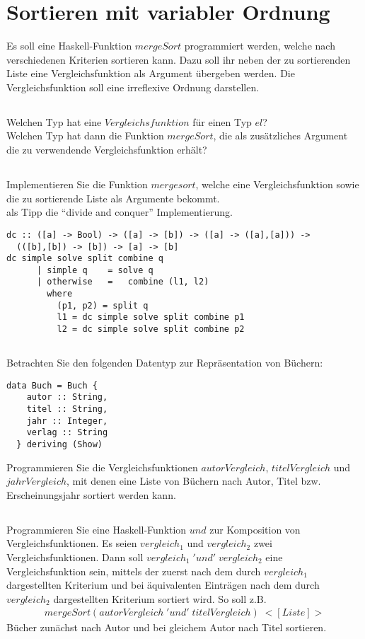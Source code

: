 \documentclass{article}
\begin{document}
\section{Sortieren mit variabler Ordnung}
Es soll eine Haskell-Funktion $mergeSort$ programmiert werden, welche nach verschiedenen
Kriterien sortieren kann. Dazu soll ihr neben der zu sortierenden Liste eine
Vergleichsfunktion als Argument übergeben werden. Die Vergleichsfunktion soll eine
irreflexive Ordnung darstellen.
\subsection{}
Welchen Typ hat eine $Vergleichsfunktion$ für einen Typ $el$?\\
Welchen Typ hat dann die Funktion $mergeSort$, die als zusätzliches Argument die
zu verwendende Vergleichsfunktion erhält?
\subsection{}
Implementieren Sie die Funktion $mergesort$, welche eine Vergleichsfunktion sowie die zu sortierende Liste als Argumente bekommt.\\
als Tipp die "`divide and conquer"' Implementierung.
\begin{lstlisting}
dc :: ([a] -> Bool) -> ([a] -> [b]) -> ([a] -> ([a],[a])) -> 
  (([b],[b]) -> [b]) -> [a] -> [b]
dc simple solve split combine q 
      | simple q 	= solve q
      | otherwise 	= 	combine (l1, l2)
        where 
          (p1, p2) = split q
          l1 = dc simple solve split combine p1
          l2 = dc simple solve split combine p2	
\end{lstlisting}
\subsection{}
Betrachten Sie den folgenden Datentyp zur Repräsentation von Büchern:
\begin{lstlisting}
data Buch = Buch {
    autor :: String,
    titel :: String,
    jahr :: Integer,
    verlag :: String
  } deriving (Show)
\end{lstlisting}
Programmieren Sie die Vergleichsfunktionen $autorVergleich$, $titelVergleich$ und
$jahrVergleich$, mit denen eine Liste von Büchern nach Autor, Titel bzw. Erscheinungsjahr
sortiert werden kann.
\subsection{}
Programmieren Sie eine Haskell-Funktion $und$ zur Komposition von Vergleichsfunktionen.
Es seien $vergleich_1$ und $vergleich_2$ zwei Vergleichsfunktionen. Dann soll
$vergleich_1\;'und'\;vergleich_2$ eine Vergleichsfunktion sein, mittels der zuerst nach dem
durch $vergleich_1$ dargestellten Kriterium und bei äquivalenten Einträgen nach dem
durch $vergleich_2$ dargestellten Kriterium sortiert wird. So soll z.B.
\begin{align*}
mergeSort (autorVergleich \;'und' \;titelVergleich) \;<[Liste]>
\end{align*}
Bücher zunächst nach Autor und bei gleichem Autor nach Titel sortieren.
\end{document}
